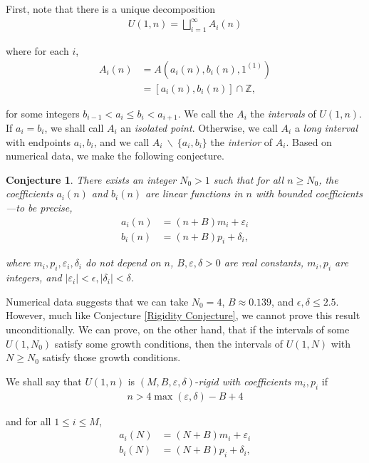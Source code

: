 \documentclass{amsart}
\newcommand{\ZZ}{\mathbb{Z}}
\theoremstyle{theorem}
\newtheorem{conjecture}{Conjecture}[section]
\theoremstyle{definition}
\begin{document}
First, note that there is a unique decomposition
\begin{align*}
U(1,n) = \bigsqcup_{i = 1}^\infty A_i(n)
\end{align*}

\noindent where for each $i$,
\begin{align*}
A_i(n) &= A\left(a_i(n), b_i(n), 1^{(1)}\right) \\
	&= \left[a_i(n), b_i(n)\right] \cap \ZZ,
\end{align*}

\noindent for some integers $b_{i - 1} < a_i \leq b_i < a_{i + 1}$. We call the $A_i$ the \emph{intervals} of $U(1,n)$. If $a_i = b_i$, we shall call $A_i$ an \emph{isolated point}. Otherwise, we call $A_i$ a \emph{long interval} with endpoints $a_i, b_i$, and we call $A_i \ \backslash \ \{a_i, b_i\}$ the \emph{interior} of $A_i$. Based on numerical data, we make the following conjecture.

\begin{conjecture}\label{NumericalRigidity}
There exists an integer $N_0 > 1$ such that for all $n \geq N_0$, the coefficients $a_i(n)$ and $b_i(n)$ are linear functions in $n$ with bounded coefficients---to be precise,
\begin{align*}
	a_i(n) &= (n + B)m_i + \varepsilon_i \\
    b_i(n) &= (n + B)p_i + \delta_i,
\end{align*}

\noindent where $m_i, p_i, \varepsilon_i, \delta_i$ do not depend on $n$, $B, \varepsilon, \delta > 0$ are real constants, $m_i, p_i$ are integers, and $|\varepsilon_i| < \epsilon, |\delta_i| < \delta$.
\end{conjecture}

Numerical data suggests that we can take $N_0 = 4$, $B \approx 0.139$, and $\epsilon, \delta 
\leqslant 2.5$. However, much like Conjecture \ref{Rigidity Conjecture}, we cannot prove this result unconditionally. We can prove, on the other hand, that if the intervals of some $U(1,N_0)$ satisfy some growth conditions, then the intervals of $U(1,N)$ with $N \geq N_0$ satisfy those growth conditions.

We shall say that $U(1,n)$ is $(M,B,\varepsilon,\delta)$-\emph{rigid with coefficients} $m_i, p_i$ if
	\begin{align*}
    n > 4\max(\varepsilon,\delta)-B+4
    \end{align*}
    
\noindent and for all $1 \leq i \leq M$,
	\begin{align*}
    a_i(N) &= (N + B)m_i + \varepsilon_i \\
    b_i(N) &= (N + B)p_i + \delta_i,
    \end{align*}
    
\end{document}
